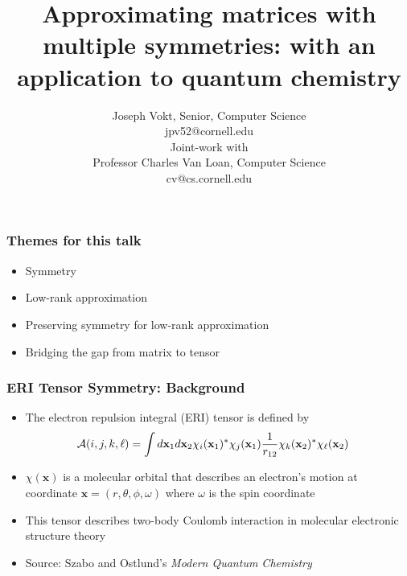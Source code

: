 \documentclass[bigger]{beamer}
\title{Approximating matrices with multiple symmetries: with an application to quantum chemistry}
\author{Joseph Vokt, Senior, Computer Science\\jpv52@cornell.edu\\Joint-work with \\Professor Charles Van Loan, Computer Science\\cv@cs.cornell.edu}
\date{}
\begin{document}
\maketitle



\section{}
\begin{frame}
\frametitle{Themes for this talk}
\label{sec-1-1}
\begin{itemize}

\item Symmetry
\label{sec-1-1-1}%

\item Low-rank approximation
\label{sec-1-1-2}%

\item Preserving symmetry for low-rank approximation
\label{sec-1-1-3}%

\item Bridging the gap from matrix to tensor
\label{sec-1-1-4}%
\end{itemize} %
\end{frame}
\begin{frame}
\frametitle{ERI Tensor Symmetry: Background}
\label{sec-1-2}
\begin{itemize}

\item The electron repulsion integral (ERI) tensor is defined by
\label{sec-1-2-1}%
\begin{align*}
&{\cal A}(i,j,k,\ell)
=\int d\textbf{x}_1d\textbf{x}_2 \chi_i(\textbf{x}_1)^*\chi_j(\textbf{x}_1)\frac{1}{r_{12}} \chi_k(\textbf{x}_2)^*\chi_{\ell}(\textbf{x}_2)
\end{align*}

\item $\chi(\textbf{x})$ is a molecular orbital that describes an electron's motion at coordinate $\textbf{x}=(r,\theta,\phi,\omega)$ where $\omega$ is the spin coordinate
\label{sec-1-2-2}%

\item This tensor describes two-body Coulomb interaction in molecular electronic structure theory
\label{sec-1-2-3}%

\item Source: Szabo and Ostlund's \emph{Modern Quantum Chemistry}
\label{sec-1-2-4}%
\end{itemize} %
\end{frame}
\end{document}

